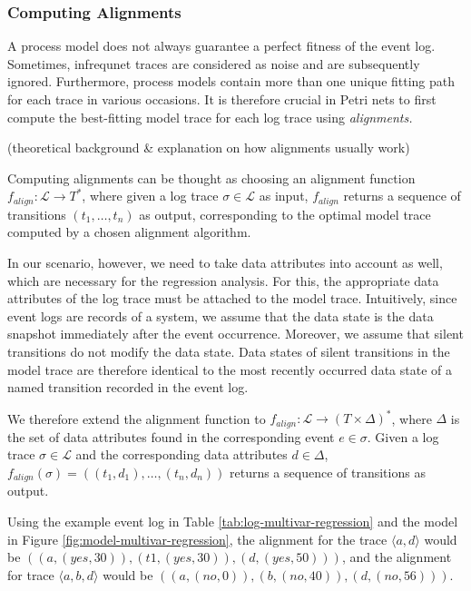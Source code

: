 \subsubsection*{Computing Alignments}

A process model does not always guarantee a perfect fitness of the event log. Sometimes, infrequnet traces are considered as noise and are subsequently ignored. Furthermore, process models contain more than one unique fitting path for each trace in various occasions. It is therefore crucial in Petri nets to first compute the best-fitting model trace for each log trace using \emph{alignments.} 

(theoretical background \& explanation on how alignments usually work)

Computing alignments can be thought as choosing an alignment function $f_{align} \colon \mathcal{L} \rightarrow T^*$, where given a log trace $\sigma \in \mathcal{L}$ as input, $f_{align}$ returns a sequence of transitions $(t_1, \dots, t_n)$ as output, corresponding to the optimal model trace computed by a chosen alignment algorithm.

In our scenario, however, we need to take data attributes into account as well, which are necessary for the regression analysis. For this, the appropriate data attributes of the log trace must be attached to the model trace. Intuitively, since event logs are records of a system, we assume that the data state is the data snapshot immediately after the event occurrence. Moreover, we assume that silent transitions do not modify the data state. Data states of silent transitions in the model trace are therefore identical to the most recently occurred data state of a named transition recorded in the event log.

We therefore extend the alignment function to $f_{align} \colon \mathcal{L} \rightarrow (T \times \Delta)^*$, where $\Delta$ is the set of data attributes found in the corresponding event $e \in \sigma$. Given a log trace $\sigma \in \mathcal{L}$ and the corresponding data attributes $d \in \Delta$, $f_{align}(\sigma) = ((t_1, d_1), \dots, (t_n, d_n))$ returns a sequence of transitions as output.

Using the example event log in Table \ref{tab:log-multivar-regression} and the model in Figure \ref{fig:model-multivar-regression}, the alignment for the trace $\langle a, d \rangle$ would be $((a, (yes, 30)), (t1, (yes, 30)), (d, (yes, 50)))$, and the alignment for trace $\langle a, b, d \rangle$ would be $((a, (no, 0)), (b, (no, 40)), (d, (no, 56)))$.

